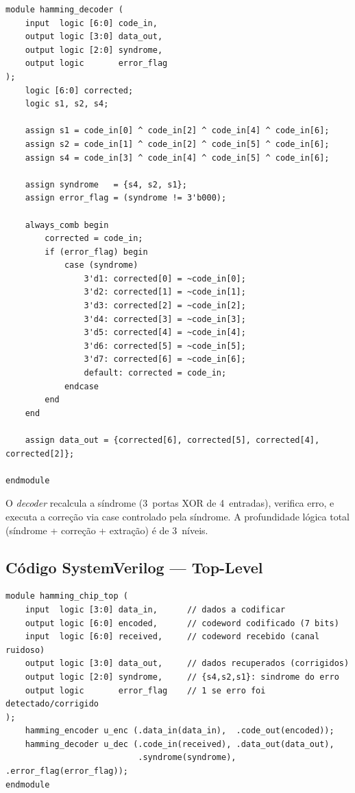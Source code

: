\documentclass[12pt,a4paper]{article}
\begin{document}
\begin{lstlisting}[style=svstyle,caption={hamming\_decoder.sv --- Decodificador / Corretor combinacional 7$\to$4 bits},label=lst:decoder]
module hamming_decoder (
    input  logic [6:0] code_in,
    output logic [3:0] data_out,
    output logic [2:0] syndrome,
    output logic       error_flag
);
    logic [6:0] corrected;
    logic s1, s2, s4;

    assign s1 = code_in[0] ^ code_in[2] ^ code_in[4] ^ code_in[6];
    assign s2 = code_in[1] ^ code_in[2] ^ code_in[5] ^ code_in[6];
    assign s4 = code_in[3] ^ code_in[4] ^ code_in[5] ^ code_in[6];

    assign syndrome   = {s4, s2, s1};
    assign error_flag = (syndrome != 3'b000);

    always_comb begin
        corrected = code_in;
        if (error_flag) begin
            case (syndrome)
                3'd1: corrected[0] = ~code_in[0];
                3'd2: corrected[1] = ~code_in[1];
                3'd3: corrected[2] = ~code_in[2];
                3'd4: corrected[3] = ~code_in[3];
                3'd5: corrected[4] = ~code_in[4];
                3'd6: corrected[5] = ~code_in[5];
                3'd7: corrected[6] = ~code_in[6];
                default: corrected = code_in;
            endcase
        end
    end

    assign data_out = {corrected[6], corrected[5], corrected[4], corrected[2]};

endmodule
\end{lstlisting}

O \textit{decoder} recalcula a síndrome (3~portas XOR de 4~entradas), verifica erro, e executa a correção via case controlado pela síndrome. A profundidade lógica total (síndrome + correção + extração) é de 3~níveis.

\subsection{Código SystemVerilog --- Top-Level}

\begin{lstlisting}[style=svstyle,caption={hamming\_chip\_top.sv --- Integração encoder/decoder},label=lst:top]
module hamming_chip_top (
    input  logic [3:0] data_in,      // dados a codificar
    output logic [6:0] encoded,      // codeword codificado (7 bits)
    input  logic [6:0] received,     // codeword recebido (canal ruidoso)
    output logic [3:0] data_out,     // dados recuperados (corrigidos)
    output logic [2:0] syndrome,     // {s4,s2,s1}: sindrome do erro
    output logic       error_flag    // 1 se erro foi detectado/corrigido
);
    hamming_encoder u_enc (.data_in(data_in),  .code_out(encoded));
    hamming_decoder u_dec (.code_in(received), .data_out(data_out),
                           .syndrome(syndrome), .error_flag(error_flag));
endmodule
\end{lstlisting}
\end{document}
